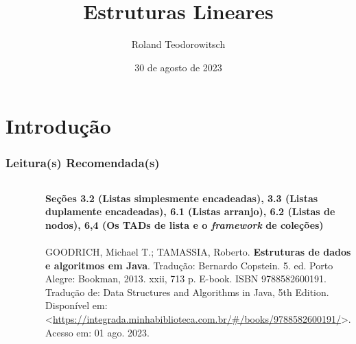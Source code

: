 \documentclass[aspectratio=169]{beamer}
\title[\sc{Estruturas Lineares}]{Estruturas Lineares}
\author[Roland Teodorowitsch]{Roland Teodorowitsch}
\institute[ALEST I - EP - PUCRS]{Algoritmos e Estruturas de Dados I - Escola Politécnica - PUCRS}
\date{30 de agosto de 2023}
\begin{document}
\justifying

\begin{frame}
	\titlepage
\end{frame}

\section{Introdução}

\begin{frame}\frametitle{Leitura(s) Recomendada(s)}

\begin{columns}[T]
\begin{column}{0.15\linewidth}
\vspace{-3mm}
\begin{figure}[h]
	\centering
	\includegraphics[height=0.3\paperheight]{imagens/livro_goodrich.jpg}
\end{figure}
\end{column}
\begin{column}{0.85\linewidth}
\tiny{\textbf{Seções 3.2 (Listas simplesmente encadeadas), 3.3 (Listas duplamente encadeadas), 6.1 (Listas arranjo), 6.2 (Listas de nodos), 6,4 (Os TADs de lista e o \emph{framework} de coleções)}\\
~}\\
\scriptsize{GOODRICH, Michael T.; TAMASSIA, Roberto. \textbf{Estruturas de dados e algoritmos em Java}. Tradução: Bernardo Copstein. 5. ed. Porto Alegre: Bookman, 2013. xxii, 713 p. E-book. ISBN 9788582600191. Tradução de: Data Structures and Algorithms in Java, 5th Edition. Disponível em: \textless{}\url{https://integrada.minhabiblioteca.com.br/\#/books/9788582600191/}\textgreater{}. Acesso em: 01 ago. 2023.}
\end{column}
\end{columns}

\end{frame}
\end{document}
